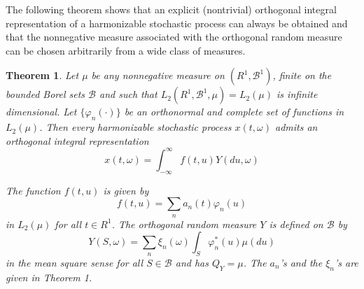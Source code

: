 \documentclass{article}
\newtheorem{theorem}{Theorem}
\begin{document}
The following theorem shows that an explicit (nontrivial) orthogonal integral representation of a harmonizable stochastic process can always be obtained and that the nonnegative measure associated with the orthogonal random measure can be chosen arbitrarily from a wide class of measures.

\begin{theorem}
Let $\mu$ be any nonnegative measure on $(R^{1}, \mathscr{B}^{1})$, finite on the bounded Borel sets $\mathscr{B}$ and such that $L_{2}(R^{1}, \mathscr{B}^{1}, \mu)=L_{2}(\mu)$ is infinite dimensional. Let $\{\varphi_{n}(\cdot)\}$ be an orthonormal and complete set of functions in $L_{2}(\mu)$. Then every harmonizable stochastic process $x(t, \omega)$ admits an orthogonal integral representation
\[
x(t, \omega)=\int_{-\infty}^{\infty} f(t, u) Y(d u, \omega)
\]

The function $f(t, u)$ is given by
\[
f(t, u)=\sum_{n} a_{n}(t) \varphi_{n}(u)
\]
in $L_{2}(\mu)$ for all $t \in R^{1}$. The orthogonal random measure $Y$ is defined on $\mathscr{B}$ by
\[
Y(S, \omega)=\sum_{n} \xi_{n}(\omega) \int_{S} \varphi_{n}^{*}(u) \mu(d u)
\]
in the mean square sense for all $S \in \mathscr{B}$ and has $Q_{Y}=\mu$. The $a_{n}$'s and the $\xi_{n}$'s are given in Theorem 1.
\end{theorem}
\end{document}
